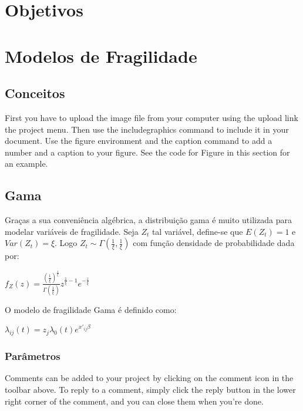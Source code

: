 \documentclass[a4paper]{article}
\begin{document}
\section{Objetivos}

\section{Modelos de Fragilidade}

\subsection{Conceitos}

First you have to upload the image file from your computer using the upload link the project menu. Then use the includegraphics command to include it in your document. Use the figure environment and the caption command to add a number and a caption to your figure. See the code for Figure in this section for an example.

\subsection{Gama}

Graças a sua conveniência algébrica, a distribuição gama é muito utilizada para modelar variáveis de fragilidade. Seja $Z_{t}$ tal variável, define-se que $E\left(Z_{t}\right)=1$ e $Var\left(Z_{t}\right)=\xi$. Logo $Z_{t}\sim\Gamma\left(\frac{1}{\xi},\frac{1}{\xi}\right)$ com função densidade de probabilidade dada por:

\begin{center}
$f_{Z}\left(z\right)=\frac{\left(\frac{1}{\xi}\right)^{\frac{1}{\xi}}}{{\Gamma{\left(\frac{1}{\xi}\right)}}}z^{\frac{1}{\xi}-1}e^{-\frac{z}{\xi}}$
\end{center}

O modelo de fragilidade Gama é definido como:

\begin{center}
$\lambda_{ij}\left(t\right)=z_{j}\lambda_{0}\left(t\right)e^{x'_{ij}\beta}$
\end{center}

\subsubsection{Parâmetros}

Comments can be added to your project by clicking on the comment icon in the toolbar above.
To reply to a comment, simply click the reply button in the lower right corner of the comment, and you can close them when you're done.
\end{document}
